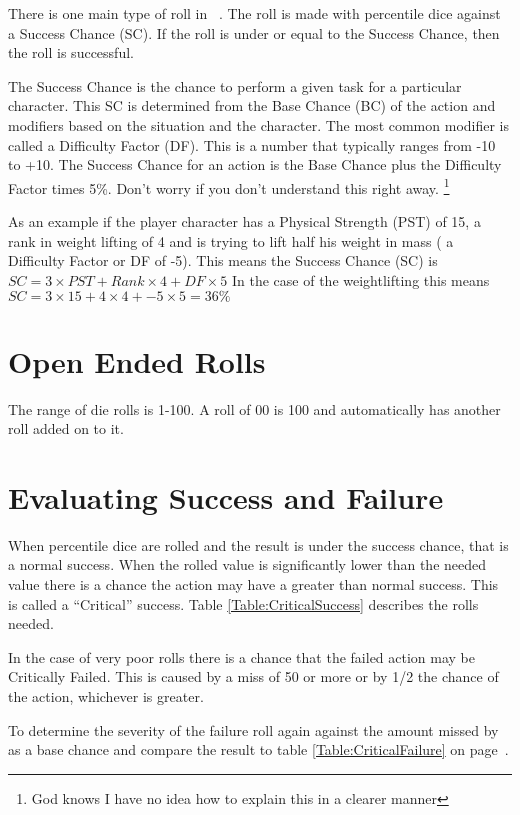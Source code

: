 There is one main type of roll in \SH\ . The roll is 
made with percentile dice against a Success Chance (SC). If the roll 
is under or equal to the Success Chance, then the roll is successful.

The Success Chance is the chance to perform a given task for a particular
character. This SC is determined from the Base Chance (BC) of the action 
and modifiers based on the situation and the character. The most common 
modifier is called a Difficulty Factor (DF). This is a number that typically 
ranges from -10 to +10. The Success Chance for an action is the Base Chance plus 
the Difficulty Factor times 5\%. Don't worry if you don't understand 
this right away. \footnote{God knows I have no idea how to explain 
this in a clearer manner}

As an example if the player character has a Physical Strength (PST) of 15, a rank in 
weight lifting of 4 and is trying to lift half his weight in mass ( a Difficulty Factor or DF of -5). 
This means the Success Chance (SC) is $ SC = 3 \times PST + Rank \times 4 + DF \times 5 $
In the case of the weightlifting this means $ SC = 3 \times 15 + 4 \times 4 + -5 \times 5  = 36\% $

\section{Open Ended Rolls}

The range of die rolls is 1-100. A roll of 00 is 100 and 
automatically has another roll added on to it.

\section{Evaluating Success and Failure}

When percentile dice are rolled and the result is under the success chance, that
is a normal success. When the rolled value is significantly lower than the needed 
value there is a chance the action may have a greater than normal success. This is 
called a ``Critical'' success. Table \ref{Table:CriticalSuccess} describes the 
rolls needed.



In the case of very poor rolls there is a chance that the failed action 
may be Critically Failed. This is caused by a miss of 50 or more or by 
1/2 the chance of the action, whichever is greater.

To determine the severity of the failure roll again against the 
amount missed by as a base chance and compare the result to table 
\ref{Table:CriticalFailure} on page~\pageref{Table:CriticalFailure}.


